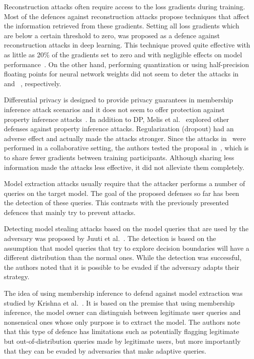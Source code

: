 Reconstruction attacks often require access to the loss gradients during training. Most of the defences against reconstruction attacks propose techniques that affect the information retrieved from these gradients. Setting all loss gradients which are below a certain threshold to zero, was proposed as a defence against reconstruction attacks in deep learning. This technique proved quite effective with as little as 20\% of the gradients set to zero and with negligible effects on model performance~. On the other hand, performing quantization or using half-precision floating points for neural network weights did not seem to deter the attacks in~ and ~, respectively.

Differential privacy is designed to provide privacy guarantees in membership inference attack scenarios and it does not seem to offer protection against property inference attacks~. In addition to DP, Melis et al.~ explored other defenses against property inference attacks. Regularization (dropout) had an adverse effect and actually made the attacks stronger. Since the attacks in~ were performed in a collaborative setting, the authors tested the proposal in~, which is to share fewer gradients between training participants. Although sharing less information made the attacks less effective, it did not alleviate them completely.

Model extraction attacks usually require that the attacker performs a number of queries on the target model. The goal of the proposed defenses so far has been the detection of these queries. This contrasts with the previously presented defences that mainly try to prevent attacks.

Detecting model stealing attacks based on the model queries that are used by the adversary was proposed by Juuti et al.~. The detection is based on the assumption that model queries that try to explore decision boundaries will have a different distribution than the normal ones. While the detection was successful, the authors noted that it is possible to be evaded if the adversary adapts their strategy.

The idea of using membership inference to defend against model extraction was studied by Krishna et al.~. It is based on the premise that using membership inference, the model owner can distinguish between legitimate user queries and nonsensical ones whose only purpose is to extract the model. The authors note that this type of defence has limitations such as potentially flagging legitimate but out-of-distribution queries made by legitimate users, but more importantly that they can be evaded by adversaries that make adaptive queries.

